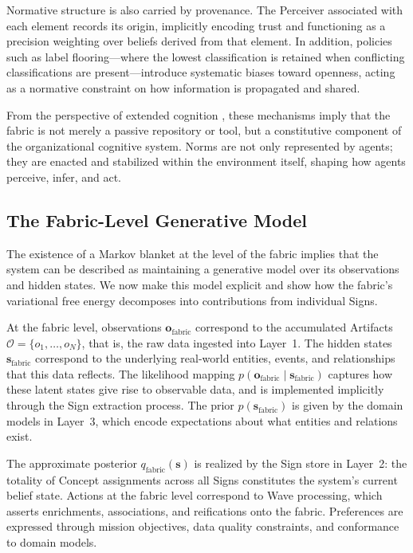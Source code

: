 \documentclass[11pt,a4paper]{article}
\theoremstyle{definition}
\newcommand{\bq}{q}
\newcommand{\bp}{p}
\newcommand{\bo}{\bm{o}}
\newcommand{\bs}{\bm{s}}
\begin{document}
Normative structure is also carried by provenance. The Perceiver associated with each element records its origin, implicitly encoding trust and functioning as a precision weighting over beliefs derived from that element. In addition, policies such as label flooring---where the lowest classification is retained when conflicting classifications are present---introduce systematic biases toward openness, acting as a normative constraint on how information is propagated and shared.

From the perspective of extended cognition \citep{veissiere2020thinking}, these mechanisms imply that the fabric is not merely a passive repository or tool, but a constitutive component of the organizational cognitive system. Norms are not only represented by agents; they are enacted and stabilized within the environment itself, shaping how agents perceive, infer, and act.

\subsection{The Fabric-Level Generative Model}

The existence of a Markov blanket at the level of the fabric implies that the system can be described as maintaining a generative model over its observations and hidden states. We now make this model explicit and show how the fabric’s variational free energy decomposes into contributions from individual Signs.

At the fabric level, observations $\bo_{\text{fabric}}$ correspond to the accumulated Artifacts $\mathcal{O} = \{o_1, \ldots, o_N\}$, that is, the raw data ingested into Layer~1. The hidden states $\bs_{\text{fabric}}$ correspond to the underlying real-world entities, events, and relationships that this data reflects. The likelihood mapping $\bp(\bo_{\text{fabric}} \mid \bs_{\text{fabric}})$ captures how these latent states give rise to observable data, and is implemented implicitly through the Sign extraction process. The prior $\bp(\bs_{\text{fabric}})$ is given by the domain models in Layer~3, which encode expectations about what entities and relations exist.

The approximate posterior $\bq_{\text{fabric}}(\bs)$ is realized by the Sign store in Layer~2: the totality of Concept assignments across all Signs constitutes the system’s current belief state. Actions at the fabric level correspond to Wave processing, which asserts enrichments, associations, and reifications onto the fabric. Preferences are expressed through mission objectives, data quality constraints, and conformance to domain models.
\end{document}
